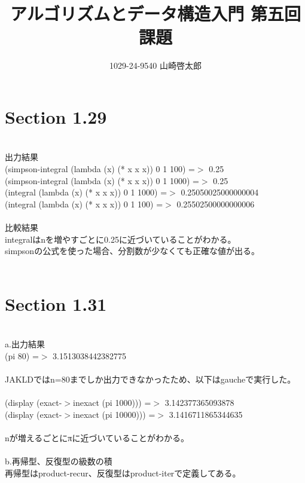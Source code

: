 ﻿\documentclass[a4paper,12pt]{article}
\title{アルゴリズムとデータ構造入門 第五回課題}
\author{1029-24-9540 山崎啓太郎}
\begin{document}
\maketitle

\section{Section 1.29}
\lstset{numbers=left,basicstyle=\small}

\\
\large{出力結果}\\
(simpson-integral (lambda (x) (* x x x)) 0 1 100) =$>$ 0.25\\
(simpson-integral (lambda (x) (* x x x)) 0 1 1000) =$>$ 0.25\\
(integral (lambda (x) (* x x x)) 0 1 1000) =$>$ 0.25050025000000004\\
(integral (lambda (x) (* x x x)) 0 1 100) =$>$ 0.25502500000000006\\
\\
\large{比較結果}\\
integralはnを増やすごとに0.25に近づいていることがわかる。\\
simpsonの公式を使った場合、分割数が少なくても正確な値が出る。\\
\\
\section{Section 1.31}
\lstset{numbers=left,basicstyle=\small}

\\
\large{a.出力結果}\\
(pi 80) =$>$ 3.1513038442382775\\
\\
JAKLDではn=80までしか出力できなかったため、以下はgaucheで実行した。\\
\\
(display (exact-$>$inexact (pi 1000))) =$>$ 3.142377365093878\\
(display (exact-$>$inexact (pi 10000))) =$>$ 3.1416711865344635\\
\\
nが増えるごとにπに近づいていることがわかる。\\
\\
\large{b.再帰型、反復型の級数の積}\\
再帰型はproduct-recur、反復型はproduct-iterで定義してある。\\
\end{document}
